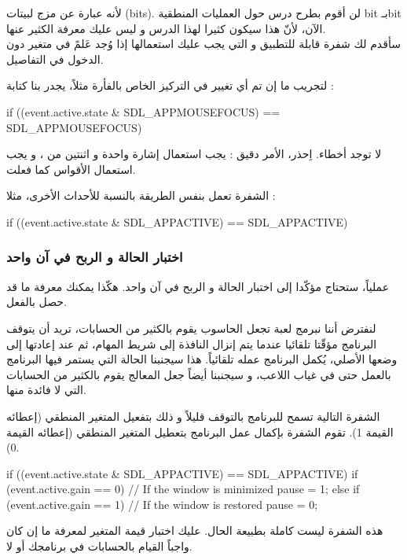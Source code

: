 لأنه عبارة عن مزج لبيتات 
(\textenglish{bits}).
لن أقوم بطرح درس حول العمليات المنطقية 
\textenglish{bit}
بـ\textenglish{bit}
الآن، لأنّ هذا سيكون كثيرا لهذا الدرس و ليس عليك معرفة الكثير عنها.\\
سأقدم لك شفرة قابلة للتطبيق و التي يجب عليك استعمالها إذا وُجد عَلمً في متغير دون الدخول في التفاصيل. 

لتجريب ما إن تم أي تغيير في التركيز الخاص بالفأرة مثلاً، يجدر بنا كتابة :  

\begin{Csource}
if ((event.active.state & SDL_APPMOUSEFOCUS) == SDL_APPMOUSEFOCUS)
\end{Csource}

لا توجد أخطاء. اِحذر، الأمر دقيق : يجب استعمال إشارة
\InlineCode{\&}
واحدة و اثنتين من
\InlineCode{=}،
و يجب استعمال الأقواس كما فعلت.

الشفرة تعمل بنفس الطريقة بالنسبة للأحداث الأخرى، مثلا :  

\begin{Csource}
if ((event.active.state & SDL_APPACTIVE) == SDL_APPACTIVE)
\end{Csource}

\subsubsection{اختبار الحالة و الربح في آن واحد}

عملياً، ستحتاج مؤكّدا إلى  اختبار الحالة و الربح في آن واحد. هكّذا يمكنك معرفة ما قد حصل بالفعل.

لنفترض أننا نبرمج لعبة تجعل الحاسوب يقوم بالكثير من الحسابات، تريد أن يتوقف البرنامج مؤقّتا تلقائيا عندما يتم إنزال النافذة إلى شريط المهام، ثم عند إعادتها إلى وضعها الأصلي، يُكمل البرنامج عمله تلقائياً. هذا سيجنبنا الحالة التي يستمر فيها البرنامج بالعمل حتى في غياب اللاعب، و سيجنبنا أيضاً جعل المعالج يقوم بالكثير من الحسابات التي لا فائدة منها.

الشفرة التالية تسمح للبرنامج بالتوقف قليلاً و ذلك بتفعيل المتغير المنطقي 
(إعطائه القيمة 1). تقوم الشفرة بإكمال عمل البرنامج بتعطيل المتغير المنطقي (إعطائه القيمة 0).

\begin{Csource}
if ((event.active.state & SDL_APPACTIVE) == SDL_APPACTIVE)
{
	if (event.active.gain == 0) // If the window is minimized
		pause = 1;
	else if (event.active.gain == 1) // If the window is restored
		pause = 0;
}
\end{Csource}

\begin{information}
هذه الشفرة ليست كاملة بطبيعة الحال. عليك اختبار قيمة المتغير
لمعرفة ما إن كان واجباً القيام بالحسابات في برنامجك أو لا.
\end{information}

